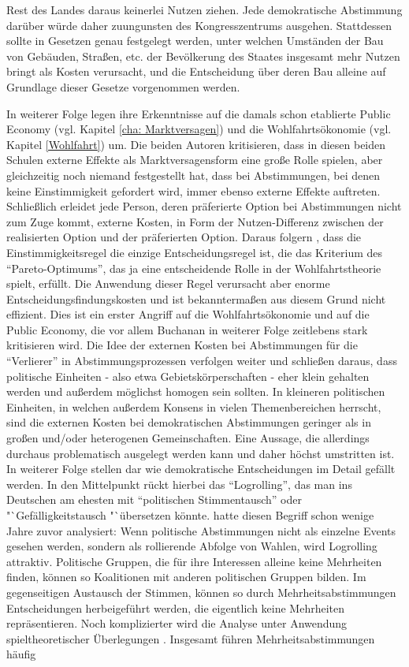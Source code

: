 Rest des Landes daraus keinerlei Nutzen ziehen. Jede demokratische Abstimmung darüber würde daher zuungunsten des Kongresszentrums ausgehen. Stattdessen sollte in Gesetzen genau festgelegt werden, unter welchen Umständen der Bau von Gebäuden, Straßen, etc. der Bevölkerung des Staates insgesamt mehr Nutzen bringt als Kosten verursacht, und die Entscheidung über deren Bau alleine auf Grundlage dieser Gesetze vorgenommen werden. 

In weiterer Folge legen \textcite[S. 110]{Buchanan1962} ihre Erkenntnisse auf die damals schon etablierte Public Economy (vgl. Kapitel \ref{cha: Marktversagen}) und die Wohlfahrtsökonomie (vgl. Kapitel \ref{Wohlfahrt}) um. Die beiden Autoren kritisieren, dass in diesen beiden Schulen externe Effekte als Marktversagensform eine große Rolle spielen, aber gleichzeitig noch niemand festgestellt hat, dass bei Abstimmungen, bei denen keine Einstimmigkeit gefordert wird, immer ebenso externe Effekte auftreten. Schließlich erleidet jede Person, deren präferierte Option bei Abstimmungen nicht zum Zuge kommt, externe Kosten, in Form der Nutzen-Differenz zwischen der realisierten Option und der präferierten Option. Daraus folgern \parencite[S. 110]{Buchanan1962}, dass die Einstimmigkeitsregel die einzige Entscheidungsregel ist, die das Kriterium des "`Pareto-Optimums"', das ja eine entscheidende Rolle in der Wohlfahrtstheorie spielt, erfüllt. Die Anwendung dieser Regel verursacht aber enorme Entscheidungsfindungskosten und ist bekanntermaßen aus diesem Grund nicht effizient. Dies ist ein erster Angriff auf die Wohlfahrtsökonomie und auf die Public Economy, die vor allem Buchanan in weiterer Folge zeitlebens stark kritisieren wird. Die Idee der externen Kosten bei Abstimmungen für die "`Verlierer"' in Abstimmungsprozessen verfolgen \textcite[S. 115]{Buchanan1962} weiter und schließen daraus, dass politische Einheiten - also etwa Gebietskörperschaften - eher klein gehalten werden und außerdem möglichst homogen sein sollten. In kleineren politischen Einheiten, in welchen außerdem Konsens in vielen Themenbereichen herrscht, sind die externen Kosten bei demokratischen Abstimmungen geringer als in großen und/oder heterogenen Gemeinschaften. Eine Aussage, die allerdings durchaus problematisch ausgelegt werden kann und daher höchst umstritten ist. In weiterer Folge stellen \textcite[S. 117]{Buchanan1962} dar wie demokratische Entscheidungen im Detail gefällt werden. In den Mittelpunkt rückt hierbei das "`Logrolling"', das man ins Deutschen am ehesten mit "`politischen Stimmentausch"' oder "`Gefälligkeitstausch "`übersetzen könnte. \textcite{Tullock1959} hatte diesen Begriff schon wenige Jahre zuvor analysiert: Wenn politische Abstimmungen nicht als einzelne Events gesehen werden, sondern als rollierende Abfolge von Wahlen, wird Logrolling attraktiv. Politische Gruppen, die für ihre Interessen alleine keine Mehrheiten finden, können so Koalitionen mit anderen politischen Gruppen bilden. Im gegenseitigen Austausch der Stimmen, können so durch Mehrheitsabstimmungen Entscheidungen herbeigeführt werden, die eigentlich keine Mehrheiten repräsentieren. Noch komplizierter wird die Analyse unter Anwendung spieltheoretischer Überlegungen \parencite[S. 149]{Buchanan1962}. Insgesamt führen Mehrheitsabstimmungen häufig 